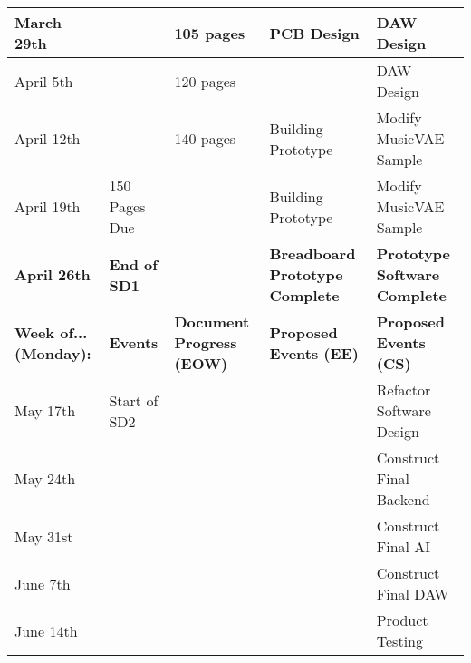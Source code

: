 \begin{table}[h!]
{\begin{tabular}{|l|l|l|l|l|}
  March 29th                    &                       & 105 pages                        & PCB Design                             & DAW Design                                           \\ \hline
  April 5th                     &                       & 120 pages                        &                                        & DAW Design                                           \\ \hline
  April 12th                    &                       & 140 pages                        & Building Prototype                     & Modify MusicVAE Sample                               \\ \hline
  April 19th                    & 150 Pages Due         &                                  & Building Prototype                     & Modify MusicVAE Sample                               \\ \hline
  \textbf{April 26th}           & \textbf{End of SD1}   & \textbf{}                        & \textbf{Breadboard Prototype Complete} & \textbf{Prototype Software Complete}                 \\ \hline
  \textbf{Week of... (Monday):} & \textbf{Events}       & \textbf{Document Progress (EOW)} & \textbf{Proposed Events (EE)}          & \textbf{Proposed Events (CS)}                        \\ \hline
  May 17th                      & Start of SD2          &                                  &                                        & Refactor Software Design                             \\ \hline
  May 24th                      &                       &                                  &                                        & Construct Final Backend                              \\ \hline
  May 31st                      &                       &                                  &                                        & Construct Final AI                                   \\ \hline
  June 7th                      &                       &                                  &                                        & Construct Final DAW                                  \\ \hline
  June 14th                     &                       &                                  &                                        & Product Testing                                      \\ \hline

\end{tabular}}
\end{table}
